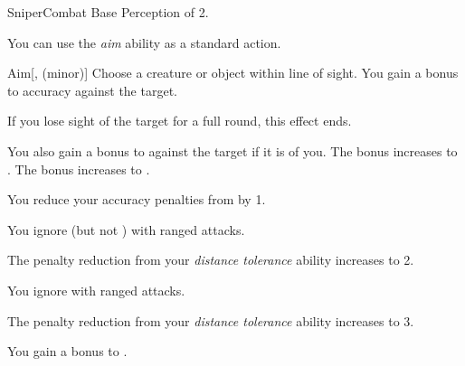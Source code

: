     \begin{feat}{Sniper}{Combat}
        \featpre Base Perception of 2.

         You can use the \textit{aim} ability as a standard action.
        \begin{freeability}{Aim}[,  (minor)]
            Choose a creature or object within line of sight.
            You gain a  bonus to accuracy against the target.

            If you lose sight of the target for a full round, this effect ends.

            \rankline
             You also gain a  bonus to  against the target if it is  of you.
             The  bonus increases to .
             The  bonus increases to .
        \end{freeability}

         You reduce your accuracy penalties from  by 1.

         You ignore  (but not ) with ranged attacks.

         The penalty reduction from your \textit{distance tolerance} ability increases to 2.

         You ignore  with ranged attacks.

         The penalty reduction from your \textit{distance tolerance} ability increases to 3.

         You gain a  bonus to .
    \end{feat}

